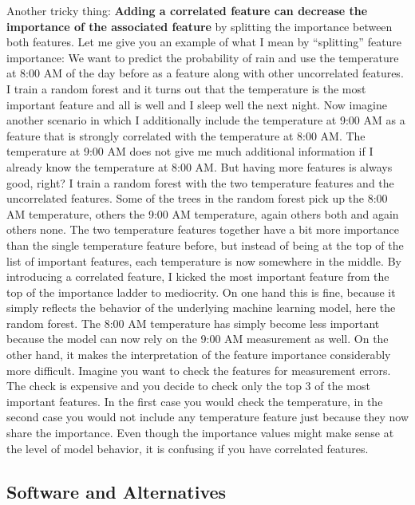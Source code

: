 \documentclass[
  12pt,
]{krantz}
\begin{document}
Another tricky thing:
\textbf{Adding a correlated feature can decrease the importance of the associated feature} by splitting the importance between both features.
Let me give you an example of what I mean by ``splitting'' feature importance:
We want to predict the probability of rain and use the temperature at 8:00 AM of the day before as a feature along with other uncorrelated features.
I train a random forest and it turns out that the temperature is the most important feature and all is well and I sleep well the next night.
Now imagine another scenario in which I additionally include the temperature at 9:00 AM as a feature that is strongly correlated with the temperature at 8:00 AM.
The temperature at 9:00 AM does not give me much additional information if I already know the temperature at 8:00 AM.
But having more features is always good, right?
I train a random forest with the two temperature features and the uncorrelated features.
Some of the trees in the random forest pick up the 8:00 AM temperature, others the 9:00 AM temperature, again others both and again others none.
The two temperature features together have a bit more importance than the single temperature feature before, but instead of being at the top of the list of important features, each temperature is now somewhere in the middle.
By introducing a correlated feature, I kicked the most important feature from the top of the importance ladder to mediocrity.
On one hand this is fine, because it simply reflects the behavior of the underlying machine learning model, here the random forest.
The 8:00 AM temperature has simply become less important because the model can now rely on the 9:00 AM measurement as well.
On the other hand, it makes the interpretation of the feature importance considerably more difficult.
Imagine you want to check the features for measurement errors.
The check is expensive and you decide to check only the top 3 of the most important features.
In the first case you would check the temperature, in the second case you would not include any temperature feature just because they now share the importance.
Even though the importance values might make sense at the level of model behavior, it is confusing if you have correlated features.

\hypertarget{software-and-alternatives-2}{%
\subsection{Software and Alternatives}\label{software-and-alternatives-2}}
\end{document}

